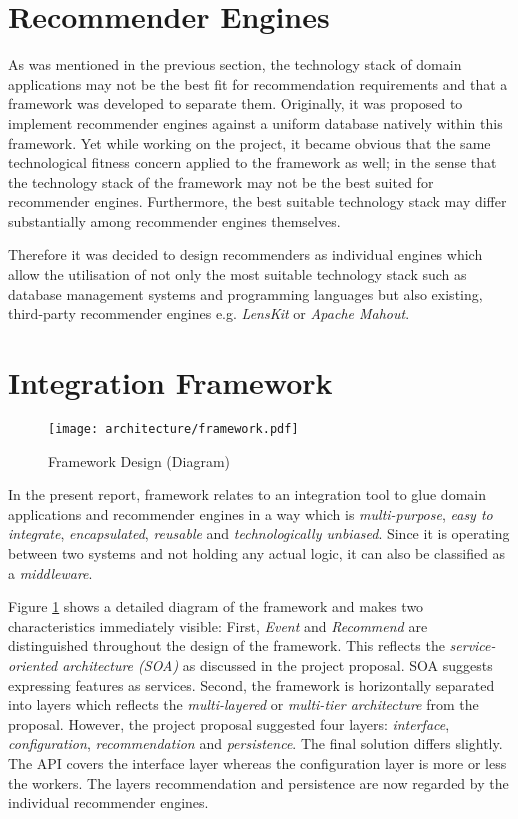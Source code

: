 \section{Recommender Engines}
\label{architecture-recommender-engines}

As was mentioned in the previous section, the technology stack of domain applications may not be the best fit for recommendation requirements and that a framework was developed to separate them. Originally, it was proposed to implement recommender engines against a uniform database natively within this framework. Yet while working on the project, it became obvious that the same technological fitness concern applied to the framework as well; in the sense that the technology stack of the framework may not be the best suited for recommender engines. Furthermore, the best suitable technology stack may differ substantially among recommender engines themselves.

Therefore it was decided to design recommenders as individual engines which allow the utilisation of not only the most suitable technology stack such as database management systems and programming languages but also existing, third-party recommender engines e.g. \emph{LensKit} or \emph{Apache Mahout}.

\section{Integration Framework}
\label{architecture-integration-framework}

\begin{figure}[ht]
    \texttt{[image: architecture/framework.pdf]}
    \caption{Framework Design (Diagram)}
    \label{fig:architecture-framework}
\end{figure}

In the present report, framework relates to an integration tool to glue domain applications and recommender engines in a way which is \emph{multi-purpose}, \emph{easy to integrate}, \emph{encapsulated}, \emph{reusable} and \emph{technologically unbiased}. Since it is operating between two systems and not holding any actual logic, it can also be classified as a \emph{middleware}.

Figure \ref{fig:architecture-framework} shows a detailed diagram of the framework and makes two characteristics immediately visible: First, \emph{Event} and \emph{Recommend} are distinguished throughout the design of the framework. This reflects the \emph{service-oriented architecture (SOA)} as discussed in the project proposal. SOA suggests expressing features as services. Second, the framework is horizontally separated into layers which reflects the \emph{multi-layered} or \emph{multi-tier architecture} from the proposal. However, the project proposal suggested four layers: \emph{interface}, \emph{configuration}, \emph{recommendation} and \emph{persistence}. The final solution differs slightly. The API covers the interface layer whereas the configuration layer is more or less the workers. The layers recommendation and persistence are now regarded by the individual recommender engines.

